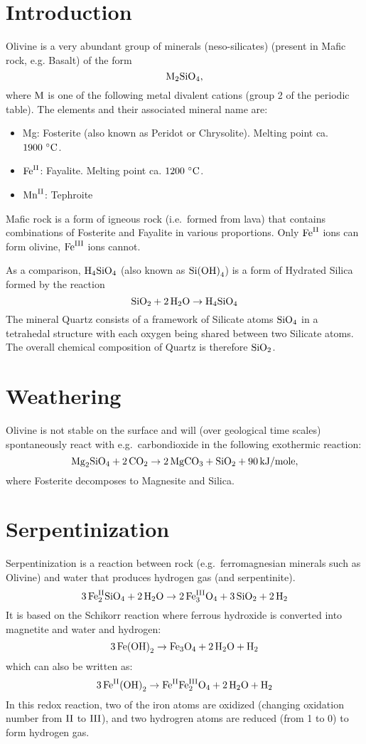 \documentclass[a4paper,14pt]{extarticle}
\def\H{{\rm H}}
\def\O{{\rm O}}
\def\M{{\rm M}}
\def\C{{\rm C}}
\def\Fe{{\rm Fe}}
\def\Mg{{\rm Mg}}
\def\Mn{{\rm Mn}}
\def\Si{{\rm Si}}
\def\II{{\rm II}}
\def\III{{\rm III}}
\begin{document}

\section{Introduction}

Olivine\cite{olivine} is a very abundant group of minerals (neso-silicates\cite{orthosilicate}) (present in Mafic rock,
e.g. Basalt) of the form
\[
    \M_2\Si\O_4,
\]
where $\M$ is one of the following metal divalent cations (group 2 of the periodic table).  The
elements and their associated mineral name are:
\begin{itemize}
    \itemsep=0em
    \item\Mg: Fosterite (also known as Peridot or Chrysolite). Melting point ca. $1900\ {}^\circ\C$.
    \item$\Fe^{\II}$: Fayalite. Melting point ca. $1200\ {}^\circ\C$.
    \item$\Mn^{\II}$: Tephroite
\end{itemize}
Mafic\cite{mafic} rock is a form of igneous rock (i.e.\ formed from lava) that contains combinations of Fosterite and Fayalite in
various proportions.  Only $\Fe^{\II}$ ions can form olivine, $\Fe^{\III}$ ions cannot.

As a comparison, $\H_4\Si\O_4$ (also known as $\Si{(\O\H)}_4$) is a form of Hydrated Silica\cite{hydrated_silica} formed
by the reaction
\[
    \Si\O_2 + 2\, \H_2\O \rightarrow \H_4\Si\O_4
\]
The mineral Quartz\cite{quartz} consists of a framework of Silicate atoms $\Si\O_4$ in a tetrahedal structure with each
oxygen being shared between two Silicate atoms. The overall chemical composition of Quartz is therefore $\Si\O_2$.


\section{Weathering}
Olivine is not stable on the surface and will (over geological time scales) spontaneously react with e.g.\ carbondioxide
in the following exothermic reaction:
\[
    \Mg_2\Si\O_4 + 2\,\C\O_2 \rightarrow 2\,\Mg\C\O_3 + \Si\O_2 + 90\, {\rm kJ / mole},
\]
where Fosterite decomposes to Magnesite and Silica.

\section{Serpentinization}

Serpentinization\cite{serpentinization} is a reaction between rock (e.g.\ ferromagnesian minerals such as Olivine) and
water that produces hydrogen gas (and serpentinite).
\[
    3\, \Fe^{\II}_2\Si \O_4 + 2\,\H_2\O \rightarrow 2\,\Fe^{\III}_3\O_4 + 3\,\Si \O_2 + 2\,\H_2
\]
It is based on the Schikorr reaction\cite{schikorr_reaction} where ferrous hydroxide is converted into magnetite and
water and hydrogen:
\[
    3\, \Fe{(\O\H)}_2 \rightarrow \Fe_3\O_4 + 2\,\H_2\O + \H_2
\]
which can also be written as:
\[
    3\, \Fe^{\II}{(\O\H)}_2 \rightarrow \Fe^{\II}\Fe^{\III}_2\O_4 + 2\,\H_2\O + \H_2
\]
In this redox reaction, two of the iron atoms are oxidized (changing oxidation number from $\II$ to $\III$), and
two hydrogren atoms are reduced (from 1 to 0) to form hydrogen gas.
\end{document}
